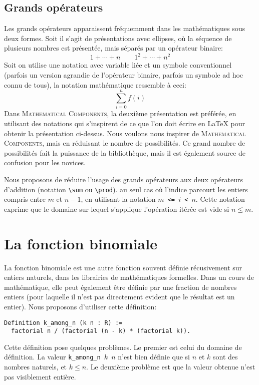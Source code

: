 \documentclass[draft]{jflart}
\newcommand{\cmd}[1]{\texttt{\textbackslash {#1}}}
\newcommand{\mathcomp}{\textsc{Mathematical Components}}
\begin{document}
\subsection{Grands opérateurs}
Les grands opérateurs apparaissent fréquemment dans les mathématiques
sous deux formes.  Soit il s'agit de présentations avec ellipses, où
la séquence de plusieurs nombres est présentée, mais séparés par un
opérateur binaire:
\[1 + \cdots + n  \qquad 1 ^ 2 + \cdots + n ^ 2 \]
Soit on utilise une notation avec variable liée et un symbole
conventionnel (parfois un version agrandie de l'opérateur binaire,
parfois un symbole ad hoc connu de tous), la notation mathématique
ressemble à ceci:
\[\sum_{i=0}^{n} f(i)\]
Dans \mathcomp{}, la deuxième présentation est préférée, en utilisant
des notations qui s'inspirent de ce que l'on doit écrire en \LaTeX{}
pour obtenir la présentation ci-dessus.  Nous voulons nous inspirer de
\mathcomp{}, mais en réduisant le nombre de possibilités.  Ce grand
nombre de possibilités fait la puissance de la bibliothèque, mais il
est également source de confusion pour les novices.

Nous proposons de réduire l'usage des grands opérateurs aux deux
opérateurs d'addition (notation \cmd{sum} ou \cmd{prod}).
au seul cas où
l'indice parcourt les entiers compris entre \({m}\) et \({n - 1}\),
en utilisant la notation \texttt{\(m\) <= \(i\) < \(n\)}.  Cette
notation exprime que le domaine sur lequel s'applique l'opération
itérée est vide si \(n \leq m\).



\section{La fonction binomiale}
La fonction binomiale est une autre fonction souvent définie
récusivement sur entiers naturels, dans les librairies de
mathématiques formelles.  Dans un cours de mathématique, elle peut
également être définie par une fraction de nombres entiers (pour
laquelle il n'est pas directement evident que le résultat est un
entier).  Nous proposons d'utiliser cette définition:
\begin{verbatim}
Definition k_among_n (k n : R) :=
  factorial n / (factorial (n - k) * (factorial k)).
\end{verbatim}

Cette définition pose quelques problèmes.  Le premier est celui du
domaine de définition.  La valeur \texttt{k\_among\_n \(k\) \(n\)} n'est bien
définie que si \(n\) et \(k\) sont des nombres naturels, et \(k \leq n\).
Le deuxième problème est que la valeur obtenue n'est pas visiblement
entière.
\end{document}
